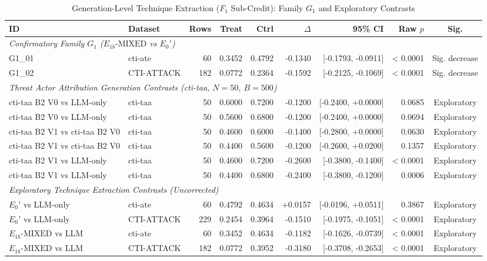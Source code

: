 \begin{table}[htbp]
\centering
\caption{Generation-Level Technique Extraction ($F_1$ Sub-Credit): Family $G_1$ and Exploratory Contrasts}
\label{tab:family_g1}
\small
\begin{tabular}{llrrrrrrc}
\hline
\textbf{ID} & \textbf{Dataset} & \textbf{Rows} & \textbf{Treat} & \textbf{Ctrl} & \textbf{$\Delta$} & \textbf{95\% CI} & \textbf{Raw $p$} & \textbf{Sig.} \\
\hline
\multicolumn{9}{l}{\textit{Confirmatory Family $G_1$ ($E_{1b}\text{-MIXED}$ vs $E_0'$)}} \\
G1_01 & cti-ate & 60 & 0.3452 & 0.4792 & -0.1340 & [-0.1793, -0.0911] & < 0.0001 & Sig. decrease \\
G1_02 & CTI-ATTACK & 182 & 0.0772 & 0.2364 & -0.1592 & [-0.2125, -0.1069] & < 0.0001 & Sig. decrease \\
\hline
\multicolumn{9}{l}{\textit{Threat Actor Attribution Generation Contrasts (cti-taa, $N=50$, $B=500$)}} \\
cti-taa B2 V0 vs LLM-only & cti-taa & 50 & 0.6000 & 0.7200 & -0.1200 & [-0.2400, +0.0000] & 0.0685 & Exploratory \\
cti-taa B2 V0 vs LLM-only & cti-taa & 50 & 0.5600 & 0.6800 & -0.1200 & [-0.2400, +0.0000] & 0.0694 & Exploratory \\
cti-taa B2 V1 vs cti-taa B2 V0 & cti-taa & 50 & 0.4600 & 0.6000 & -0.1400 & [-0.2800, +0.0000] & 0.0630 & Exploratory \\
cti-taa B2 V1 vs cti-taa B2 V0 & cti-taa & 50 & 0.4400 & 0.5600 & -0.1200 & [-0.2600, +0.0200] & 0.1357 & Exploratory \\
cti-taa B2 V1 vs LLM-only & cti-taa & 50 & 0.4600 & 0.7200 & -0.2600 & [-0.3800, -0.1400] & < 0.0001 & Exploratory \\
cti-taa B2 V1 vs LLM-only & cti-taa & 50 & 0.4400 & 0.6800 & -0.2400 & [-0.3800, -0.1200] & 0.0006 & Exploratory \\
\hline
\multicolumn{9}{l}{\textit{Exploratory Technique Extraction Contrasts (Uncorrected)}} \\
$E_0'$ vs LLM-only & cti-ate & 60 & 0.4792 & 0.4634 & +0.0157 & [-0.0196, +0.0511] & 0.3867 & Exploratory \\
$E_0'$ vs LLM-only & CTI-ATTACK & 229 & 0.2454 & 0.3964 & -0.1510 & [-0.1975, -0.1051] & < 0.0001 & Exploratory \\
$E_{1b}\text{-MIXED}$ vs LLM & cti-ate & 60 & 0.3452 & 0.4634 & -0.1182 & [-0.1626, -0.0739] & < 0.0001 & Exploratory \\
$E_{1b}\text{-MIXED}$ vs LLM & CTI-ATTACK & 182 & 0.0772 & 0.3952 & -0.3180 & [-0.3708, -0.2653] & < 0.0001 & Exploratory \\
\hline
\end{tabular}
\end{table}

